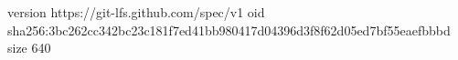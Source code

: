 version https://git-lfs.github.com/spec/v1
oid sha256:3bc262cc342bc23c181f7ed41bb980417d04396d3f8f62d05ed7bf55eaefbbbd
size 640
